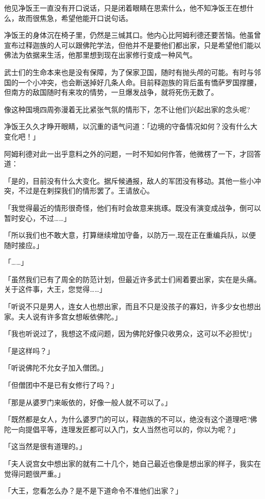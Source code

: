 \documentclass[twoside,openany]{book}
\begin{document}
他见净饭王一直没有开口说话，只是闭着眼睛在思索什么，他不知净饭王在想什么，故而很焦急，希望他能开口说句话。

净饭王的身体沉在椅子里，仍然是三缄其口。他内心比阿姆利德还要苦恼。他虽曾宣布过释迦族的人可以跟佛陀学法，但他并不是要他们都出家，只是希望他们能以佛法为依据来生活，他那里想到现在出家修行变成一种风气。

武士们的生命本来也是没有保障，为了保家卫国，随时有抛头颅的可能。有时与邻国的一个小冲突，也会断送掉好几条人命。目前释迦族的背后虽有憍萨罗国撑腰，但南方的敌国随时有来攻的情势，一旦爆发战争，就将死伤无数了。

像这种国境四周弥漫着无比紧张气氛的情形下，怎不让他们兴起出家的念头呢?

净饭王久久才睁开眼睛，以沉重的语气问道：「边境的守备情况如何？没有什么大变化吧！」

阿姆利德对此一出乎意料之外的问题，一时不知如何作答，他微楞了一下，才回答道：

「是的，目前没有什么大变化。据斥候通报，敌人的军团没有移动。其他一些小冲突，不过是在剌探我们的情形罢了。王请放心。

「我觉得最近的情形很奇怪，他们有时会故意来挑琢。既没有演变成战争，倒可以暂时安心，不过……」

「所以我们也不敢大意，打算继续增加守备，以防万一,现在正在重编兵队，以便随时接应。」

「……」

「虽然我们已有了周全的防范计划，但最近许多武士们闹着要出家，实在是头痛。关于这件事，大王，您觉得……」

「听说不只是男人，连女人也想出家，而且不只是没孩子的寡妇，许多少女也想出家。夫人说有许多宫女想皈依佛陀。」

「我也听说过了，我想这不成问题，因为佛陀好像只收男众，这可以不必担忧!」

「是这样吗？」

「听说佛陀不允女子加入僧团。」

「但僧团中不是已有女修行了吗？」

「那是从婆罗门来皈依的，好像一般人就不可以了。」

「既然都是女人，为什么婆罗门的可以，释迦族的不可以，绝没有这个道理吧?佛陀一向提倡平等，连理发匠都可以入门，女人当然也可以的，你以为呢？」

「这当然是很有道理的。」

「夫人说宫女中想出家的就有二十几个，她自己最近也像是想出家的样子，我实在觉得问题很严重。」

「大王，您看怎么办？是不是下道命令不准他们出家？」
\end{document}
